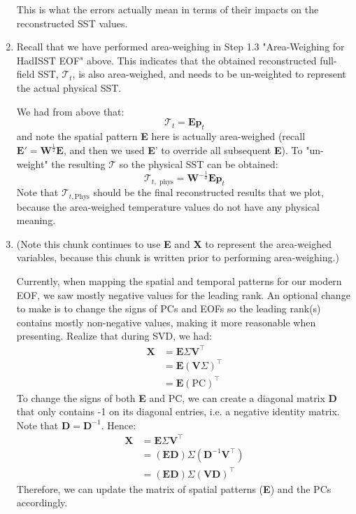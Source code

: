 \documentclass{article}
\begin{document}
\begin{enumerate}
    This is what the errors actually mean in terms of their impacts on the reconstructed SST values.

    \item Recall that we have performed area-weighing in Step 1.3 "Area-Weighing for HadISST EOF" above.
    This indicates that the obtained reconstructed full-field SST, $\mathcal{T}_t$, is also area-weighed, and needs to be un-weighted to represent the actual physical SST.
    
    We had from above that:
    $$\mathcal{T}_t = \textbf{Ep}_t$$
    and note the spatial pattern \textbf{E} here is actually area-weighed (recall $\textbf{E}' = \textbf{W}^{\frac{1}{2}} \textbf{E}$, and then we used \textbf{E}' to override all subsequent \textbf{E}).
    To "un-weight" the resulting $\mathcal{T}$ so the physical SST can be obtained:
    $$\mathcal{T}_{t, \text{ phys}} = \textbf{W}^{-\frac{1}{2}} \textbf{E} \textbf{p}_t$$
    Note that $\mathcal{T}_{t, \text{Phys}}$ should be the final reconstructed results that we plot, because the area-weighed temperature values do not have any physical meaning.

    \item (Note this chunk continues to use \textbf{E} and \textbf{X} to represent the area-weighed variables, because this chunk is written prior to performing area-weighing.)
    
    Currently, when mapping the spatial and temporal patterns for our modern EOF, we saw mostly negative values for the leading rank. 
    An optional change to make is to change the signs of PCs and EOFs so the leading rank(s) contains mostly non-negative values, making it more reasonable when presenting. Realize that during SVD, we had:
        \begin{align*}
            \textbf{X} &= \textbf{E} \Sigma \textbf{V}^\intercal \\
            &= \textbf{E}{(\textbf{V}\Sigma)}^\intercal \\
            &= \textbf{E} (\text{PC})^\intercal
        \end{align*}
    To change the signs of both \textbf{E} and PC, we can create a diagonal matrix \textbf{D} that only contains -1 on its diagonal entries, i.e. a negative identity matrix. Note that $\textbf{D} = \textbf{D}^{-1}$. Hence:
        \begin{align*}
            \textbf{X} &= \textbf{E} \Sigma \textbf{V}^\intercal \\
            &= (\textbf{ED}) \Sigma (\textbf{D}^{-1} \textbf{V}^\intercal)\\
            &= (\textbf{ED}) \Sigma (\textbf{VD})^\intercal
        \end{align*}
    Therefore, we can update the matrix of spatial patterns (\textbf{E}) and the PCs accordingly.


\end{enumerate}
\end{document}
